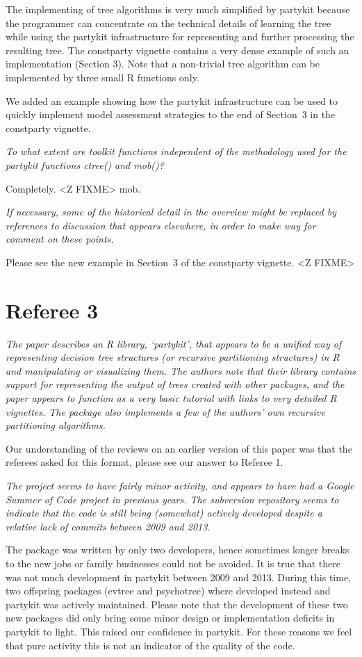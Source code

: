 \documentclass{article}
\begin{document}
The implementing of tree algorithms is very much simplified by partykit
because the programmer can concentrate on the technical details of learning
the tree while using the partykit infrastructure for representing and
further processing the resulting tree. The constparty vignette contains a
very dense example of such an implementation (Section 3). Note that a
non-trivial tree algorithm can be implemented by three small R functions
only.

We added an example showing how the partykit infrastructure can be used
to quickly implement model assessment strategies to the end of Section~3 in
the constparty vignette.

\textit{To what extent are toolkit functions independent of
the methodology used for the partykit functions ctree() and mob()?}

Completely. <Z FIXME> mob.

\textit{If necessary, some of the historical detail in the overview might be replaced
by references to discussion that appears elsewhere, in order to make way for
comment on these points.}

Please see the new example in Section~3 of the constparty vignette.
<Z FIXME>

\section*{Referee 3}

\textit{
The paper describes an R library, `partykit', that appears to be a unified
way of representing decision tree structures (or recursive partitioning
structures) in R and manipulating or visualizing them.  The authors note
that their library contains support for representing the output of trees
created with other packages, and the paper appears to function as a very
basic tutorial with links to very detailed R vignettes.  The package also
implements a few of the authors' own recursive partitioning algorithms.}

Our understanding of the reviews on an earlier version of this paper was
that the referees asked for this format, please see our answer to Referee 1.

\textit{
The project seems to have fairly minor activity, and appears to have had a
Google Summer of Code project in previous years.  The subversion repository
seems to indicate that the code is still being (somewhat) actively developed
despite a relative lack of commits between 2009 and 2013.}

The package was written by only two developers, hence sometimes longer
breaks to the new jobs or family businesses could not be avoided.
It is true that there was not much development in partykit between 2009 and
2013. During this time, two offspring packages (evtree and psychotree) where
developed instead and partykit was actively maintained. Please note that the
development of these two new packages did only bring some minor design or
implementation deficits in partykit to light. This raised our confidence in
partykit. For these reasons we feel that pure activity this is not an indicator of 
the quality of the code.
\end{document}
